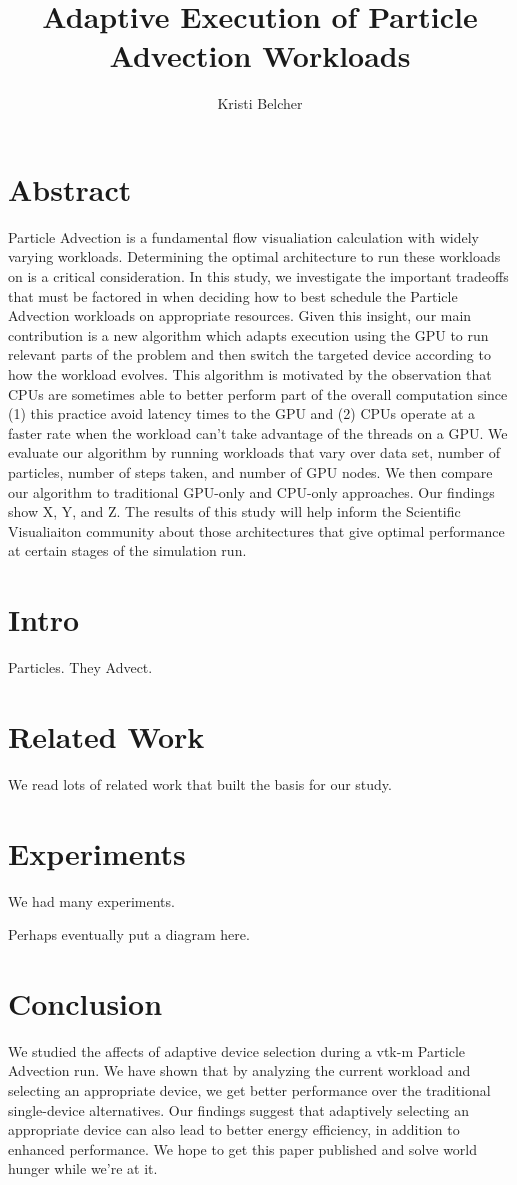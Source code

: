 \documentclass{IEEEtran}
\title{Adaptive Execution of Particle Advection Workloads}
\author{Kristi Belcher}
\begin{document}
\maketitle
\section{Abstract}
Particle Advection is a fundamental flow visualiation calculation with widely varying workloads. 
%
Determining the optimal architecture to run these workloads on is a critical consideration. 
%
In this study, we investigate the important tradeoffs that must be factored in when deciding how to best schedule the Particle Advection workloads on appropriate resources. 
%
Given this insight, our main contribution is a new algorithm which adapts execution using the GPU to run relevant parts of the problem and then switch the targeted device according to how the workload evolves.
%
This algorithm is motivated by the observation that CPUs are sometimes able to better perform part of the overall computation since (1) this practice avoid latency times to the GPU and (2) CPUs operate at a faster rate when the workload can't take advantage of the threads on a GPU.
%
We evaluate our algorithm by running workloads that vary over data set, number of particles, number of steps taken, and number of GPU nodes.
%
We then compare our algorithm to traditional GPU-only and CPU-only approaches.
%
Our findings show X, Y, and Z.
%
The results of this study will help inform the Scientific Visualiaiton community about those architectures that give optimal performance at certain stages of the simulation run.
\section{Intro}
Particles. They Advect.
%
\section{Related Work}
We read lots of related work that built the basis for our study.
%
\section{Experiments}
We had many experiments.
%
\begin{center}
 Perhaps eventually put a diagram here.
\end{center}
%
\section{Conclusion}
We studied the affects of adaptive device selection during a vtk-m Particle Advection run. 
%
We have shown that by analyzing the current workload and selecting an appropriate device, we get better performance over the traditional single-device alternatives. 
%
Our findings suggest that adaptively selecting an appropriate device can also lead to better energy efficiency, in addition to enhanced performance. 
%
We hope to get this paper published and solve world hunger while we're at it.
%
\end{document}
